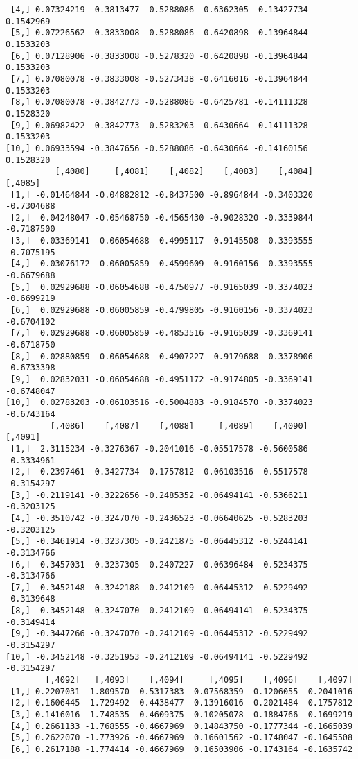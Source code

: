 \documentclass[
  letterpaper,
  DIV=11,
  numbers=noendperiod]{scrreprt}
\begin{document}
\begin{verbatim}
 [4,] 0.07324219 -0.3813477 -0.5288086 -0.6362305 -0.13427734 0.1542969
 [5,] 0.07226562 -0.3833008 -0.5288086 -0.6420898 -0.13964844 0.1533203
 [6,] 0.07128906 -0.3833008 -0.5278320 -0.6420898 -0.13964844 0.1533203
 [7,] 0.07080078 -0.3833008 -0.5273438 -0.6416016 -0.13964844 0.1533203
 [8,] 0.07080078 -0.3842773 -0.5288086 -0.6425781 -0.14111328 0.1528320
 [9,] 0.06982422 -0.3842773 -0.5283203 -0.6430664 -0.14111328 0.1533203
[10,] 0.06933594 -0.3847656 -0.5288086 -0.6430664 -0.14160156 0.1528320
          [,4080]     [,4081]    [,4082]    [,4083]    [,4084]    [,4085]
 [1,] -0.01464844 -0.04882812 -0.8437500 -0.8964844 -0.3403320 -0.7304688
 [2,]  0.04248047 -0.05468750 -0.4565430 -0.9028320 -0.3339844 -0.7187500
 [3,]  0.03369141 -0.06054688 -0.4995117 -0.9145508 -0.3393555 -0.7075195
 [4,]  0.03076172 -0.06005859 -0.4599609 -0.9160156 -0.3393555 -0.6679688
 [5,]  0.02929688 -0.06054688 -0.4750977 -0.9165039 -0.3374023 -0.6699219
 [6,]  0.02929688 -0.06005859 -0.4799805 -0.9160156 -0.3374023 -0.6704102
 [7,]  0.02929688 -0.06005859 -0.4853516 -0.9165039 -0.3369141 -0.6718750
 [8,]  0.02880859 -0.06054688 -0.4907227 -0.9179688 -0.3378906 -0.6733398
 [9,]  0.02832031 -0.06054688 -0.4951172 -0.9174805 -0.3369141 -0.6748047
[10,]  0.02783203 -0.06103516 -0.5004883 -0.9184570 -0.3374023 -0.6743164
         [,4086]    [,4087]    [,4088]     [,4089]    [,4090]    [,4091]
 [1,]  2.3115234 -0.3276367 -0.2041016 -0.05517578 -0.5600586 -0.3334961
 [2,] -0.2397461 -0.3427734 -0.1757812 -0.06103516 -0.5517578 -0.3154297
 [3,] -0.2119141 -0.3222656 -0.2485352 -0.06494141 -0.5366211 -0.3203125
 [4,] -0.3510742 -0.3247070 -0.2436523 -0.06640625 -0.5283203 -0.3203125
 [5,] -0.3461914 -0.3237305 -0.2421875 -0.06445312 -0.5244141 -0.3134766
 [6,] -0.3457031 -0.3237305 -0.2407227 -0.06396484 -0.5234375 -0.3134766
 [7,] -0.3452148 -0.3242188 -0.2412109 -0.06445312 -0.5229492 -0.3139648
 [8,] -0.3452148 -0.3247070 -0.2412109 -0.06494141 -0.5234375 -0.3149414
 [9,] -0.3447266 -0.3247070 -0.2412109 -0.06445312 -0.5229492 -0.3154297
[10,] -0.3452148 -0.3251953 -0.2412109 -0.06494141 -0.5229492 -0.3154297
        [,4092]   [,4093]    [,4094]     [,4095]    [,4096]    [,4097]
 [1,] 0.2207031 -1.809570 -0.5317383 -0.07568359 -0.1206055 -0.2041016
 [2,] 0.1606445 -1.729492 -0.4438477  0.13916016 -0.2021484 -0.1757812
 [3,] 0.1416016 -1.748535 -0.4609375  0.10205078 -0.1884766 -0.1699219
 [4,] 0.2661133 -1.768555 -0.4667969  0.14843750 -0.1777344 -0.1665039
 [5,] 0.2622070 -1.773926 -0.4667969  0.16601562 -0.1748047 -0.1645508
 [6,] 0.2617188 -1.774414 -0.4667969  0.16503906 -0.1743164 -0.1635742

\end{verbatim}
\end{document}
